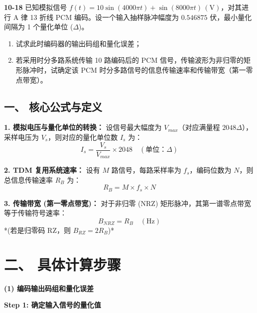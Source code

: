 \documentclass[a4paper,11pt]{ctexart}
\begin{document}
\noindent \textbf{10-18} 已知模拟信号 $f(t) = 10\sin(4000\pi t) + \sin(8000\pi t) \, (\text{V})$，对其进行 A 律 13 折线 PCM 编码。设一个输入抽样脉冲幅度为 $0.546875$ 伏，最小量化间隔为 1 个量化单位 ($\Delta$)。
\begin{enumerate}[label=(\arabic*)]
    \item 试求此时编码器的输出码组和量化误差；
    \item 若采用时分多路系统传输 10 路编码后的 PCM 信号，传输波形为非归零的矩形脉冲时，试确定该 PCM 时分多路信号的信息传输速率和传输带宽（第一零点带宽）。
\end{enumerate}
\begin{tcolorbox}[colback=white, colframe=blue!50!black, title=\textbf{题目解答：10-18 A 律编码与 TDM 参数计算}]

    \section*{一、 核心公式与定义}
    
    \textbf{1. 模拟电压与量化单位的转换：}
    设信号最大幅度为 $V_{max}$（对应满量程 $2048\Delta$），采样电压为 $V_s$，则对应的量化单位数 $I_s$ 为：
    \begin{equation}
        I_s = \frac{V_s}{V_{max}} \times 2048 \quad (\text{单位：}\Delta)
    \end{equation}
    
    \textbf{2. TDM 复用系统速率：}
    设有 $M$ 路信号，每路采样率为 $f_s$，编码位数为 $N$，则总信息传输速率 $R_B$ 为：
    \begin{equation}
        R_B = M \times f_s \times N
    \end{equation}
    
    \textbf{3. 传输带宽 (第一零点带宽)：}
    对于非归零 (NRZ) 矩形脉冲，其第一谱零点带宽等于传输符号速率：
    \begin{equation}
        B_{NRZ} = R_B \quad (\text{Hz})
    \end{equation}
    *(若是归零码 RZ，则 $B_{RZ} = 2 R_B$)*

    \end{tcolorbox}

    \section*{二、 具体计算步骤}
    
    \textbf{(1) 编码输出码组和量化误差}
    
    \textbf{Step 1: 确定输入信号的量化值}
    
\end{document}
